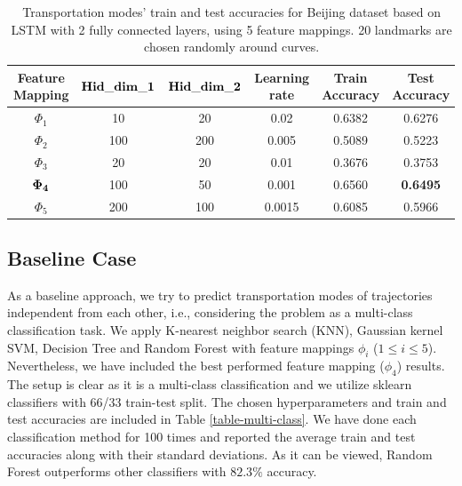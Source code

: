 \documentclass[11pt]{myclass}
\begin{document}
\begin{table}[htbp]
\centering
\begin{tabular}{|c|c|c|c|c|c|}
\hline
       {\bf Feature Mapping} &  {$\rm \bf Hid\_dim\_1$} &  {$\rm \bf Hid\_dim\_2$} &  {\bf Learning rate}  &   {\bf Train Accuracy} &  {\bf Test Accuracy}   \\
\hline 

$\Phi_1$	& 10  & 20  &  0.02 &   0.6382 &    0.6276  \\ 
\hline 
$\Phi_2$	& 100  & 200  &  0.005 &   0.5089 &    0.5223  \\ 
\hline 
$\Phi_3$	& 20 &  20  & 0.01 &   0.3676 &    0.3753  \\ 
\hline 
$\bf \Phi_4$	& 100  & 50  &  0.001 &   0.6560 &    {\bf 0.6495}  \\ 
\hline 
$\Phi_5$	& 200 &  100  & 0.0015 &   0.6085 &    0.5966  \\ 
\hline 
\end{tabular}
\caption{Transportation modes' train and test accuracies for Beijing dataset based on LSTM with 2 fully connected layers, using 5 feature mappings. 20 landmarks are chosen randomly around curves.}
\label{table-LSTM2}
\normalsize
\end{table}


\subsection{Baseline Case}

As a baseline approach, we try to predict transportation modes of trajectories independent from each other, i.e., considering the problem as a multi-class classification task. We apply K-nearest neighbor search (KNN), Gaussian kernel SVM, Decision Tree and Random Forest with feature mappings $\phi_i$ ($1 \leq i \leq 5$). Nevertheless, we have included the best performed feature mapping ($\phi_4$) results. The setup is clear as it is a multi-class classification and we utilize sklearn classifiers with 66/33 train-test split. The chosen hyperparameters and train and test accuracies are included in Table \ref{table-multi-class}. We have done each classification method for 100 times and reported the average train and test accuracies along with their standard deviations. As it can be viewed, Random Forest outperforms other classifiers with $82.3\%$ accuracy. 
\end{document}
